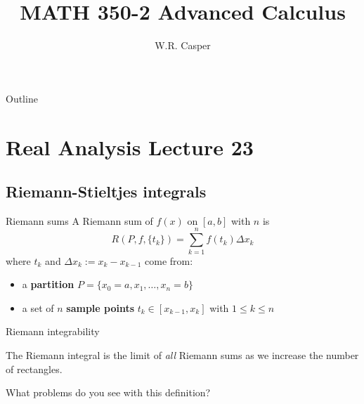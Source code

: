 \documentclass{beamer}
\title{MATH 350-2 Advanced Calculus}
\subtitle
{} %
\author[W.R. Casper] %
{W.R. Casper}
\institute[California State University Fullerton] %
{
  Department of Mathematics\\
  California State University Fullerton}
\begin{document}
\begin{frame}
  \titlepage
\end{frame}

\begin{frame}{Outline}
  \tableofcontents
\end{frame}



\section{Real Analysis Lecture 23}

\subsection{Riemann-Stieltjes integrals}

\begin{frame}{Riemann sums}
A Riemann sum of $f(x)$ on $[a,b]$ with $n$ is
$$R(P,f,\{t_k\}) = \sum_{k=1}^n f(t_k)\Delta x_k$$
\pause
where $t_k$ and $\Delta x_k := x_k-x_{k-1}$ come from:
\begin{itemize}
\pause
\item a \textbf{partition} $P =\{x_0=a,x_1,\dots, x_n=b\}$
\pause
\item a set of $n$ \textbf{sample points} $t_k\in [x_{k-1},x_k]$ with $1\leq k\leq n$
\end{itemize}
\end{frame}

\begin{frame}{Riemann integrability}
\begin{defn}
The Riemann integral is the limit of \emph{all} Riemann sums as we increase the number of rectangles.
\end{defn}
\pause
\begin{quest}
What problems do you see with this definition?
\end{quest}
\end{frame}
\end{document}
